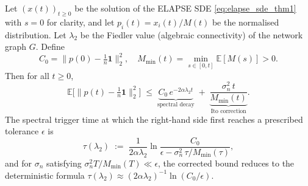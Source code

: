 %
%
%

\begin{corollary}
\label{cor:spectral_decay}
Let $(x(t))_{t\ge 0}$ be the solution of the ELAPSE SDE
\eqref{eq:elapse_sde_thm1} with $s=0$ for clarity, and let
$p_i(t)=x_i(t)/M(t)$ be the normalised distribution.
Let $\lambda_2$ be the Fiedler value (algebraic connectivity) of the
network graph $G$.  Define
\begin{equation}
  C_0 = \bigl\|p(0) - \tfrac{1}{n}\mathbf{1}\bigr\|_2^2,
  \quad
  M_{\min}(t) = \min_{s\in[0,t]} \mathbb{E}[M(s)] > 0.
\end{equation}
Then for all $t\ge 0$,
\begin{equation}
  \mathbb{E}\bigl[\|p(t) - \tfrac{1}{n}\mathbf{1}\|_2^2\bigr]
  \;\le\;
  \underbrace{C_0\,e^{-2\alpha\lambda_2 t}}_{\text{spectral decay}}
  \;+\;
  \underbrace{\frac{\sigma_n^2\,t}{M_{\min}(t)}}_{\text{Ito correction}}.
  \label{eq:spectral_bound_corrected}
\end{equation}
The spectral trigger time at which the right-hand side first reaches a
prescribed tolerance $\epsilon$ is
\begin{equation}
  \tau(\lambda_2) \;:=\; \frac{1}{2\alpha\lambda_2}\ln\!\frac{C_0}{\epsilon
  - \sigma_n^2\,\tau/M_{\min}(\tau)},
  \label{eq:tau_lambda2}
\end{equation}
and for $\sigma_n$ satisfying $\sigma_n^2 T / M_{\min}(T)\ll\epsilon$,
the corrected bound reduces to the deterministic formula
$\tau(\lambda_2)\approx(2\alpha\lambda_2)^{-1}\ln(C_0/\epsilon)$.
\end{corollary}

